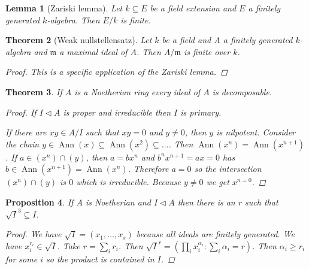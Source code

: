 \documentclass{article}
\DeclareMathOperator{\Ann}{Ann}
\newcommand{\maxid}{\mathfrak{m}}
\newcommand{\ideal}{\triangleleft}
\newtheorem{theorem}{Theorem}[section]
\newtheorem{lemma}[theorem]{Lemma}
\newtheorem{proposition}[theorem]{Proposition}
\theoremstyle{definition}
\begin{document}
\begin{lemma}[Zariski lemma]
    Let \(k\subseteq E\) be a field extension and \(E\) a finitely generated
    \(k\)-algebra. Then \(E/k\) is finite.
\end{lemma}

\begin{theorem}[Weak nullstellensatz]
    Let \(k\) be a field and \(A\) a finitely generated \(k\)-algebra and
    \(\maxid\) a maximal ideal of \(A\). Then \(A/\maxid\) is finite over
    \(k\).

    \begin{proof}
        This is a specific application of the Zariski lemma.
    \end{proof}
\end{theorem}

\begin{theorem}
    If \(A\) is a Noetherian ring every ideal of \(A\) is decomposable.

    \begin{proof}
        If \(I\ideal A\) is proper and irreducible then \(I\) is primary.

        If there are \(xy\in A/I\) such that \(xy=0\) and \(y\neq 0\), then
        \(y\) is nilpotent. Consider the chain
        \(y\in\Ann(x)\subseteq\Ann(x^{2})\subseteq\ldots\). Then
        \(\Ann(x^{n})=\Ann(x^{n+1})\). If \(a\in(x^{n})\cap(y)\), then
        \(a=bx^{n}\) and \(b^{n}x^{n+1}=ax=0\) has
        \(b\in\Ann(x^{n+1})=\Ann(x^{n})\). Therefore \(a=0\) so the intersection
        \((x^{n})\cap (y)\) is \(0\) which is irreducible. Because \(y\neq 0\)
        we get \(x^{n=0}\).
    \end{proof}
\end{theorem}

\begin{proposition}
    If \(A\) is Noetherian and \(I\ideal A\) then there is an \(r\) such that
    \(\sqrt{I}^{3}\subseteq I\).

    \begin{proof}
        We have \(\sqrt{I}=(x_{1},\ldots,x_{s})\) because all ideals are
        finitely generated. We have \(x_{i}^{r_{i}}\in\sqrt{I}\). Take
        \(r=\sum_{i}r_{i}\). Then
        \(\sqrt{I}^{r}=(\prod_{i}x_{i}^{\alpha_{i}}:\sum_{i}\alpha_{i}=r)\).
        Then \(\alpha_{i}\geq r_{i}\) for some \(i\) so the product is contained
        in \(I\).
    \end{proof}
\end{proposition}
\end{document}
